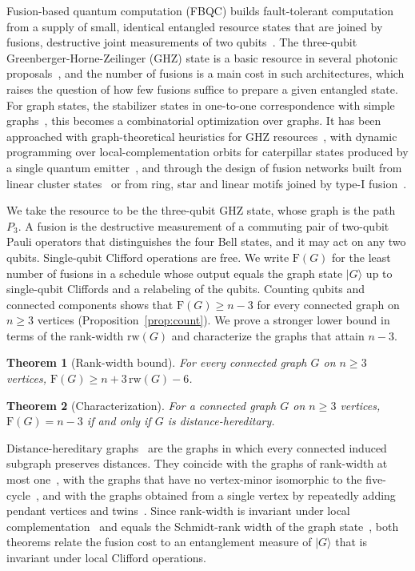 \documentclass[aps,pra,onecolumn,superscriptaddress,nofootinbib,longbibliography]{revtex4-2}
\theoremstyle{plain}
\newtheorem{theorem}{Theorem}
\theoremstyle{remark}
\newcommand{\F}{\mathrm{F}}
\newcommand{\rw}{\mathrm{rw}}
\begin{document}
Fusion-based quantum computation (FBQC) builds fault-tolerant computation from a supply of small,
identical entangled resource states that are joined by fusions, destructive joint measurements of two
qubits~\cite{Bartolucci2023fusion}. The three-qubit Greenberger-Horne-Zeilinger (GHZ) state is a basic
resource in several photonic proposals~\cite{GimenoSegovia2015three,Zaidi2015near}, and the number of
fusions is a main cost in such architectures, which raises the question of how few fusions suffice to
prepare a given entangled state. For graph states, the stabilizer states in one-to-one correspondence
with simple graphs~\cite{Hein2004multiparty,Hein2006entanglement}, this becomes a combinatorial
optimization over graphs. It has been approached with graph-theoretical heuristics for GHZ resources~\cite{Lee2023graph},
with dynamic programming over local-complementation orbits for caterpillar states produced by a single
quantum emitter~\cite{Lobl2025generating}, and through the design of fusion networks built from linear
cluster states~\cite{Staudacher2026adaptive,Cashman2025finding} or from ring, star and linear motifs joined
by type-I fusion~\cite{Ji2026towards}.

We take the resource to be the three-qubit GHZ state, whose graph is the path $P_3$. A fusion is the
destructive measurement of a commuting pair of two-qubit Pauli operators that distinguishes the four Bell
states, and it may act on any two qubits. Single-qubit Clifford operations are free. We write $\F(G)$ for
the least number of fusions in a schedule whose output equals the graph state $|G\rangle$ up to
single-qubit Cliffords and a relabeling of the qubits. Counting qubits and connected components shows
that $\F(G)\ge n-3$ for every connected graph on $n\ge 3$ vertices (Proposition~\ref{prop:count}). We
prove a stronger lower bound in terms of the rank-width $\rw(G)$ and characterize the graphs that attain
$n-3$.

\begin{theorem}[Rank-width bound]\label{thm:rw}
For every connected graph $G$ on $n\ge 3$ vertices, $\F(G)\ge n+3\,\rw(G)-6$.
\end{theorem}

\begin{theorem}[Characterization]\label{thm:main}
For a connected graph $G$ on $n\ge 3$ vertices, $\F(G)=n-3$ if and only if $G$ is
distance-hereditary.
\end{theorem}

Distance-hereditary graphs~\cite{Howorka1977characterization,Bandelt1986distance} are the graphs in
which every connected induced subgraph preserves distances. They coincide with the graphs of rank-width
at most one~\cite{Oum2005rank}, with the graphs that have no vertex-minor isomorphic to the
five-cycle~\cite{Bouchet1987isotropic,Bouchet1988transforming,Oum2017rank}, and with the graphs obtained
from a single vertex by repeatedly adding pendant vertices and twins~\cite{Bandelt1986distance}. Since
rank-width is invariant under local complementation~\cite{Oum2005rank} and equals the Schmidt-rank width
of the graph state~\cite{VandenNest2006universal,VandenNest2007classical}, both theorems relate the
fusion cost to an entanglement measure of $|G\rangle$ that is invariant under local Clifford operations.
\end{document}
